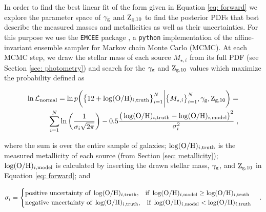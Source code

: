\documentclass[twocolumn]{aastex631}
\begin{document}
In order to find the best linear fit of the form given in Equation \ref{eq: forward} we explore the parameter space of $\gamma_{\textnormal{\scriptsize g}}$ and $\textnormal{Z}_{\textnormal{\scriptsize g,10}}$ to find the posterior PDFs that best describe the measured masses and metallicities as well as their uncertainties. For this purpose we use the \texttt{EMCEE} package \citep{emcee}, a \texttt{python} implementation of the affine-invariant ensemble sampler \citep{2010CAMCS...5...65G} for Markov chain Monte Carlo (MCMC). At each MCMC step, we draw the stellar mass of each source $M_{\star, i}$ from its full PDF (see Section \ref{sec: photometry}) and search for the $\gamma_{\textnormal{\scriptsize g}}$ and $\textnormal{Z}_{\textnormal{\scriptsize g,10}}$ values which maximize the probability defined as

\begin{equation}
\begin{split}
    \ln\mathcal{L}_{\textnormal{normal}} = \ln p\bigg(\big\{12+\log(\textnormal{O/H})_{i, \textnormal{\scriptsize truth}}\big\}_{i=1}^N\bigg| \big\{M_{\star, i}\big\}_{i=1}^N, \gamma_{\textnormal{\scriptsize g}}, \textnormal{Z}_{\textnormal{\scriptsize g,10}}\bigg) = \\
    \sum_{i=1}^{N} \ln\left( \frac{1}{\sigma_i \sqrt{2\pi}} \right) - 0.5 \frac{\big(\log(\textnormal{O/H})_{i, \textnormal{\scriptsize truth}} - \log(\textnormal{O/H})_{i, \textnormal{\scriptsize model}}\big)^2}{\sigma_i^2}\;,
\end{split}
\end{equation}

\noindent
where the sum is over the entire sample of galaxies; $\log(\textnormal{O/H})_{i, \textnormal{\scriptsize truth}}$ is the measured metallicity of each source (from Section \ref{sec: metallicity}); $\log(\textnormal{O/H})_{i, \textnormal{\scriptsize model}}$ is calculated by inserting the drawn stellar mass, $\gamma_{\textnormal{\scriptsize g}}$, and $\textnormal{Z}_{\textnormal{\scriptsize g,10}}$ in Equation \ref{eq: forward}; and

\begin{equation}
    \sigma_i =     
    \begin{cases}
      \textnormal{positive uncertainty of } \log(\textnormal{O/H})_{i, \textnormal{\scriptsize truth}}, 
      \;\;\;\text{if}\ \log(\textnormal{O/H})_{i, \textnormal{\scriptsize model}} \ge \log(\textnormal{O/H})_{i, \textnormal{\scriptsize truth}} \\
      \textnormal{negative uncertainty of } \log(\textnormal{O/H})_{i, \textnormal{\scriptsize truth}},
      \;\;\;\text{if}\ \log(\textnormal{O/H})_{i, \textnormal{\scriptsize model}} < \log(\textnormal{O/H})_{i, \textnormal{\scriptsize truth}}
    \end{cases}
    .
\label{eq: sigma}
\end{equation}
\end{document}
